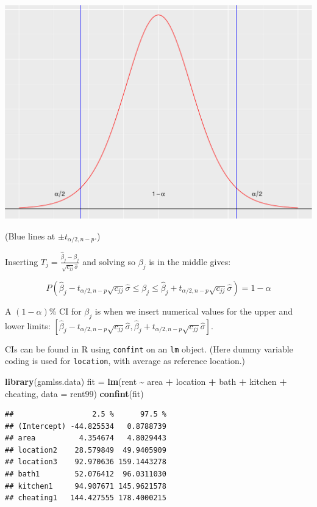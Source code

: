 \documentclass[
  ignorenonframetext,
]{beamer}
\newenvironment{Shaded}{\begin{snugshade}}{\end{snugshade}}
\newcommand{\AttributeTok}[1]{\textcolor[rgb]{0.13,0.29,0.53}{#1}}
\newcommand{\FunctionTok}[1]{\textcolor[rgb]{0.13,0.29,0.53}{\textbf{#1}}}
\newcommand{\NormalTok}[1]{#1}
\newcommand{\OtherTok}[1]{\textcolor[rgb]{0.56,0.35,0.01}{#1}}
\newcommand{\SpecialCharTok}[1]{\textcolor[rgb]{0.81,0.36,0.00}{\textbf{#1}}}
\begin{document}
\begin{frame}
\includegraphics{Module02MLRPresentationWeek2_files/figure-beamer/unnamed-chunk-2-1.pdf}

(Blue lines at \(\pm t_{\alpha/2,n-p}\).)
\end{frame}

\begin{frame}
Inserting
\(T_j =\frac{\hat{\beta}_j-\beta_j}{\sqrt{c_{jj}}\hat{\sigma}}\) and
solving so \(\beta_j\) is in the middle gives:

\[ P(\hat{\beta}_j-t_{\alpha/2,n-p}\sqrt{c_{jj}}\hat{\sigma}
\le \beta_j \le \hat{\beta}_j+t_{\alpha/2,n-p}\sqrt{c_{jj}}\hat{\sigma})=1-\alpha\]

A \((1-\alpha)\)\% CI for \(\beta_j\) is when we insert numerical values
for the upper and lower limits:
\([\hat{\beta}_j-t_{\alpha/2,n-p}\sqrt{c_{jj}}\hat{\sigma},\hat{\beta}_j+t_{\alpha/2,n-p}\sqrt{c_{jj}}\hat{\sigma}]\).
\end{frame}

\begin{frame}[fragile]
CIs can be found in R using \texttt{confint} on an \texttt{lm} object.
(Here dummy variable coding is used for \texttt{location}, with average
as reference location.)

\begin{Shaded}
\begin{Highlighting}[]
\FunctionTok{library}\NormalTok{(gamlss.data)}
\NormalTok{fit }\OtherTok{=} \FunctionTok{lm}\NormalTok{(rent }\SpecialCharTok{\textasciitilde{}}\NormalTok{ area }\SpecialCharTok{+}\NormalTok{ location }\SpecialCharTok{+}\NormalTok{ bath }\SpecialCharTok{+}\NormalTok{ kitchen }\SpecialCharTok{+}\NormalTok{ cheating, }\AttributeTok{data =}\NormalTok{ rent99)}
\FunctionTok{confint}\NormalTok{(fit)}
\end{Highlighting}
\end{Shaded}

\begin{verbatim}
##                  2.5 %      97.5 %
## (Intercept) -44.825534   0.8788739
## area          4.354674   4.8029443
## location2    28.579849  49.9405909
## location3    92.970636 159.1443278
## bath1        52.076412  96.0311030
## kitchen1     94.907671 145.9621578
## cheating1   144.427555 178.4000215
\end{verbatim}
\end{frame}
\end{document}

